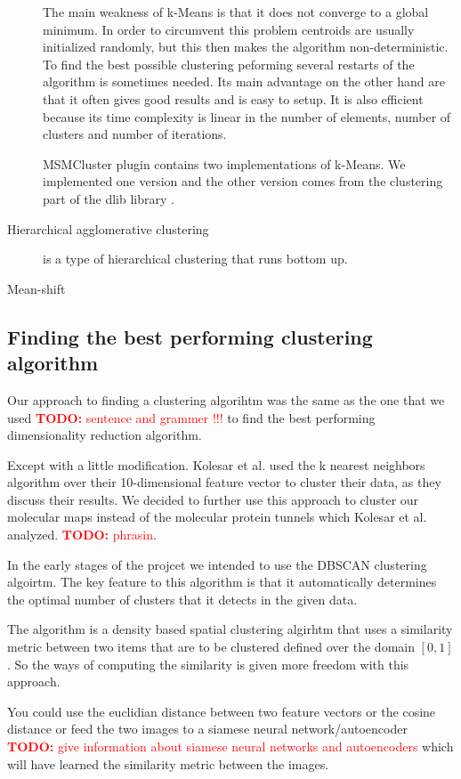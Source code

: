 \documentclass[journal]{vgtc}       %
\newcommand{\todo}[1]{\textcolor{red}{\textbf{TODO:} #1}}
\begin{document}
\begin{description}
The main weakness of k-Means is that it does not converge to a global minimum. In order to circumvent this problem centroids are usually initialized randomly, but this then makes the algorithm non-deterministic. To find the best possible clustering peforming several restarts of the algorithm is sometimes needed.  Its main advantage on the other hand are that it often gives good results and is easy to setup. It is also efficient because its time complexity is linear in the number of elements, number of clusters and number of iterations.

MSMCluster plugin contains two implementations of k-Means. We implemented one version and the other version comes from the clustering part of the dlib library \cite{dlib09}.
\item [Hierarchical agglomerative clustering] is a type of hierarchical clustering that runs bottom up. 
\item [Mean-shift]
\end{description}




\subsection{Finding the best performing clustering algorithm}
Our approach to finding a clustering algorihtm was the same as the one that we used \todo{sentence and grammer  !!! } to find the best performing dimensionality reduction algorithm.

Except with a little modification. Kolesar et al. \cite{kolesar} used the k nearest neighbors algorithm over their 10-dimensional feature vector to cluster their data, as they discuss their results. We decided to further use this approach to cluster our molecular maps instead of the molecular protein tunnels which Kolesar et al. analyzed. \todo{phrasin}.


In the early stages of the projcet we intended to use the DBSCAN clustering algoirtm. 
The key feature to this algorithm is that it automatically determines the optimal number of clusters that it detects in the given data. 

The algorithm is a density based spatial clustering algirhtm that uses a similarity metric between two items that are to be  clustered defined over the domain \([0,1]\). So the ways of computing the similarity is given more freedom with this approach.


You could use the euclidian distance between two feature vectors or the cosine distance or feed the two images to a siamese neural network/autoencoder \todo{give information about siamese neural networks and autoencoders} which will have learned the similarity metric between the images.
\end{document}
